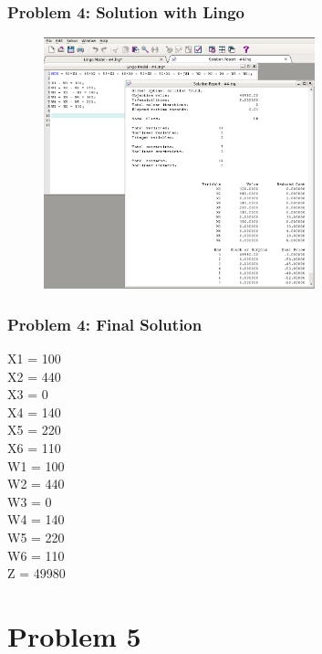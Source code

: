 \documentclass[10pt,svgnames,fragile]{beamer}
\begin{document}
\begin{frame}[label={sec:orge9abdcb}]{}

\frametitle{Problem 4: Solution with Lingo }
\begin{figure}
\includegraphics[width=0.7\textwidth]{images/4.png}
\end{figure}
\end{frame}


\begin{frame}[label={sec:org9c62e72}]{}
\frametitle{Problem 4: Final Solution}

X1 = 100\\
X2 = 440\\
X3 = 0\\
X4 = 140\\
X5 = 220\\
X6 = 110\\
W1 = 100\\
W2 = 440\\
W3 = 0\\
W4 = 140\\
W5 = 220\\
W6 = 110\\
Z = 49980
\end{frame}


\section{Problem 5}
\label{sec:org92dd686}
\end{document}
